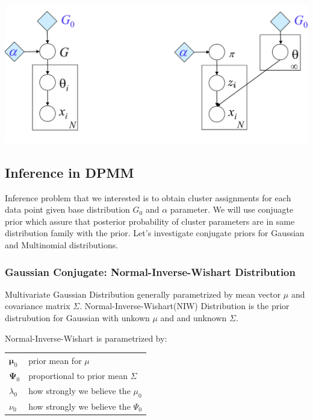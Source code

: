 \documentclass[a4paper]{article}
\begin{document}
\includegraphics[width=\textwidth]{img/pgm-dpgmm.png}

\subsection{Inference in DPMM}

Inference problem that we interested is to obtain cluster assignments
for each data point given base distribution \(G_0\) and \(\alpha\)
parameter. We will use conjuagte prior which assure that posterior
probability of cluster parameters are in same distribution family with
the prior. Let's investigate conjugate priors for Gaussian and
Multinomial distributions.


\subsubsection{Gaussian Conjugate: Normal-Inverse-Wishart Distribution}

Multivariate Gaussian Distribution generally parametrized by mean vector
\(\mu\) and covariance matrix \(\Sigma\). Normal-Inverse-Wishart(NIW)
Distribution\cite{murphy2007conjugate} is the prior distrubution for Gaussian with unkown \(\mu\) and and
unknown \(\Sigma\).

Normal-Inverse-Wishart is parametrized by:

\begin{center}
\begin{tabular}{|l|l|}
\hline
 $\boldsymbol \mu_0$  & prior mean for $\mu$ \\ 
 $\boldsymbol \Psi_0$ & proportional to prior mean $\Sigma$\\
 $\lambda_0$ & how strongly we believe the  $\mu_0$\\
 $\nu_0$ & how strongly we believe the  $\Psi_0$\\ 
 \hline
\end{tabular}
\end{center}
\end{document}
